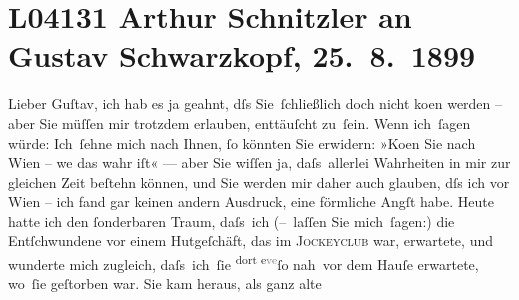 

\section[Arthur Schnitzler an Gustav Schwarzkopf, 25. 8. 1899]{L04131 Arthur Schnitzler an Gustav Schwarzkopf, 25. 8. 1899}
\nopagebreak{}
\rehead{ }\normalsize\beginnumbering{}
\toendnotes[C]{\smallbreak\pagebreak[2]}
\toendnotes[C]{\smallbreak}
\toendnotes[C]{\smallbreak}
\pstart
           \noindent{}{\pb}Lieber Guſtav, ich hab es ja geahnt, dſs Sie ſchließlich doch nicht
                  ko{\geminationm}en werden – aber Sie müſſen mir trotzdem erlauben,
               enttäuſcht zu ſein. Wenn ich ſagen würde: Ich ſehne mich nach Ihnen,{ }ſo könnten Sie
               erwidern: »Ko{\geminationm}en Sie nach Wien – we{\geminationn} das wahr iſt« — aber Sie wiſſen ja,
               daſs allerlei Wahrheiten in mir zur gleichen Zeit beſtehn können, und Sie werden mir
               daher auch glauben, dſs ich vor Wien – ich fand
               gar keinen \introOben{}andern\introOben{} Ausdruck, eine förm{\pb}liche Angſt habe. Heute hatte ich den{ }ſonderbaren Traum, daſs ich (– laſſen Sie mich ſagen:) die Entſchwundene vor einem Hutgeſchäft, das im
                  \textsc{Jockeyclub} war, erwartete, und wunderte mich zugleich, daſs ich ſie \substVorne{}\textsuperscript{dort e\textcolor{gray}{ve}}\substDazwischen{}ſo nah\substHinten{} vor dem Hauſe erwartete, wo ſie geſtorben war. Sie kam heraus, als ganz alte
